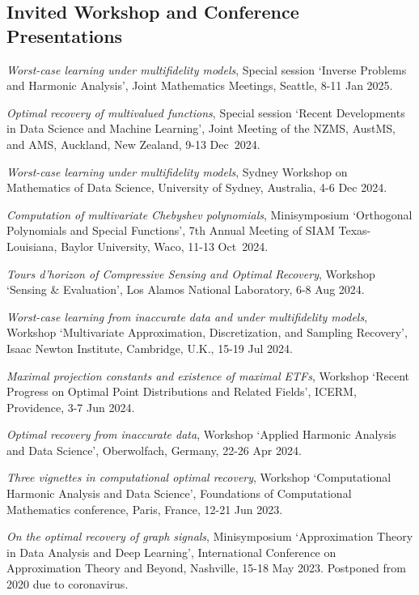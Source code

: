 \documentclass[11pt]{article}
\begin{document}
\subsection{Invited Workshop and Conference Presentations}
\bitemize 
\item {\sl Worst-case learning under multifidelity models}, Special session `Inverse Problems and Harmonic Analysis', Joint Mathematics Meetings, Seattle, 8-11 Jan 2025. 
\item {\sl Optimal recovery of multivalued functions},
Special session `Recent Developments in Data Science and Machine Learning', 
Joint Meeting of the NZMS, AustMS, and AMS, Auckland, New Zealand, 9-13 Dec~2024.
\item {\sl Worst-case learning under multifidelity models},
Sydney Workshop on Mathematics of Data Science,
University of Sydney, Australia, 4-6 Dec 2024.
\item {\sl Computation of multivariate Chebyshev polynomials}, 
Minisymposium  `Orthogonal Polynomials and Special Functions',
7th Annual Meeting of SIAM Texas-Louisiana,
Baylor University, Waco, 11-13 Oct~2024.
\item {\sl Tours d’horizon of Compressive Sensing and Optimal Recovery},
Workshop `Sensing \& Evaluation', Los Alamos National Laboratory, 6-8 Aug 2024.
\item {\sl Worst-case learning from inaccurate data and under multifidelity models},
Workshop `Multivariate Approximation, Discretization, and Sampling Recovery',
Isaac Newton Institute, Cambridge, U.K., 15-19 Jul 2024.
\item {\sl Maximal projection constants and existence of maximal ETFs},
Workshop `Recent Progress on Optimal Point Distributions and Related Fields',
ICERM, Providence,  3-7 Jun 2024.
\item {\sl Optimal recovery from inaccurate data},
Workshop `Applied Harmonic Analysis and Data Science', Oberwolfach, Germany, 
22-26 Apr 2024.
\item {\sl Three vignettes in computational optimal recovery}, 
Workshop `Computational Harmonic Analysis and Data Science',
Foundations of Computational Mathematics conference, 
Paris, France, 12-21 Jun 2023.
\item {\sl  On the optimal recovery of graph signals},
Minisymposium `Approximation Theory in Data Analysis and Deep Learning',
International Conference on Approximation Theory and Beyond,
Nashville, 15-18 May 2023. {\small Postponed from 2020 due to coronavirus.}
\end{document}
